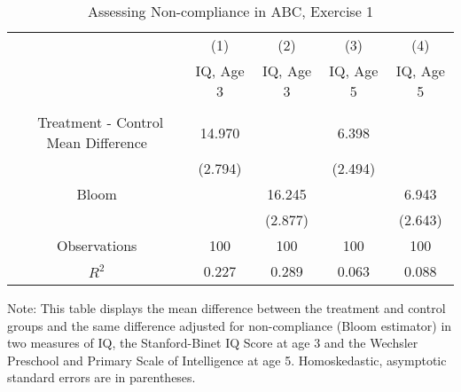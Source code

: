 \begin{table}[H] 
\begin{threeparttable}
\caption{Assessing Non-compliance in ABC, Exercise 1}
\label{table:nc1}
\centering 
\begin{tabular}{ccccc} \hline \hline
 & (1) & (2) & (3) & (4) \\
 & IQ, Age 3 & IQ, Age 3  & IQ, Age 5 & IQ, Age 5 \\ \hline
 &  &  & & \\\
Treatment - Control Mean Difference & 14.970 &  & 6.398 &  \\
 & (2.794) &  & (2.494) &  \\
Bloom &  & 16.245 &  & 6.943 \\
 &  & (2.877) &  & (2.643) \\ \hline
Observations & 100 & 100 & 100 & 100  \\
 $R^2$ & 0.227 & 0.289 & 0.063 & 0.088 \\ \hline \hline
 \end{tabular}
\begin{tablenotes}
\footnotesize
\item Note: This table displays the mean difference between the treatment and control groups and the same difference adjusted for non-compliance (Bloom estimator) in two measures of IQ, the Stanford-Binet IQ Score at age 3 and the Wechsler Preschool and Primary Scale of Intelligence at age 5. Homoskedastic, asymptotic standard errors are in parentheses.
\end{tablenotes}
\end{threeparttable}
\end{table}
